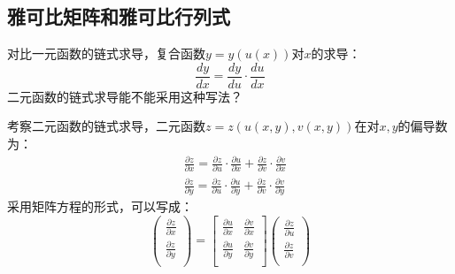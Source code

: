 \subsection{雅可比矩阵和雅可比行列式}

对比一元函数的链式求导，复合函数$y=y\left( u\left( x \right) \right) $对$x$的求导：
\[
\frac{dy}{dx}=\frac{dy}{du}\cdot \frac{du}{dx}
\]
二元函数的链式求导能不能采用这种写法？

考察二元函数的链式求导，二元函数$z=z\left( u\left( x,y \right) ,v\left( x,y \right) \right) $在对$x,y$的偏导数为：
\begin{align*}
&\frac{\partial z}{\partial x}=\frac{\partial z}{\partial u}\cdot \frac{\partial u}{\partial x}+\frac{\partial z}{\partial v}\cdot \frac{\partial v}{\partial x} \\
&\frac{\partial z}{\partial y}=\frac{\partial z}{\partial u}\cdot \frac{\partial u}{\partial y}+\frac{\partial z}{\partial v}\cdot \frac{\partial v}{\partial y}
\end{align*}
采用矩阵方程的形式，可以写成：
\[
\left( \begin{array}{c}
	\frac{\partial z}{\partial x}\\
	\frac{\partial z}{\partial y}\\
\end{array} \right) =\left[ \begin{matrix}
	\frac{\partial u}{\partial x}&		\frac{\partial v}{\partial x}\\
	\frac{\partial u}{\partial y}&		\frac{\partial v}{\partial y}\\
\end{matrix} \right] \left( \begin{array}{c}
	\frac{\partial z}{\partial u}\\
	\frac{\partial z}{\partial v}\\
\end{array} \right)
\]

~

